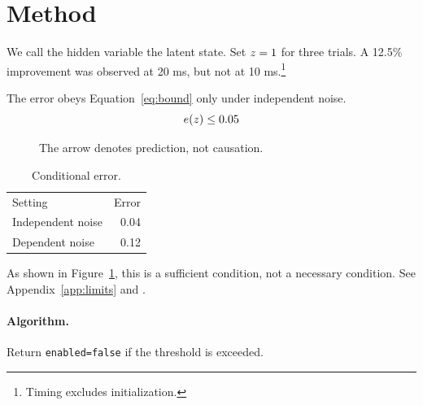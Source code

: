 \section{Method}\label{sec:method}
We call the hidden variable the latent state. Set $z=1$ for three trials. A 12.5\% improvement was observed at 20 ms, but not at 10 ms.\footnote{Timing excludes initialization.}

The error obeys Equation~\ref{eq:bound} only under independent noise.
\begin{equation}\label{eq:bound}
e(z) \leq 0.05
\end{equation}
\begin{figure}[ht]
\centering{}
\caption{The arrow denotes prediction, not causation.}\label{fig:state}
\end{figure}
\begin{table}[ht]\centering
\begin{tabular}{lr}
Setting & Error \\
Independent noise & 0.04 \\
Dependent noise & 0.12
\end{tabular}
\caption{Conditional error.}\label{tab:error}
\end{table}

As shown in Figure~\ref{fig:state}, this is a sufficient condition, not a necessary condition. See Appendix~\ref{app:limits} and \cite{example2024}.

\paragraph{Algorithm.} Return \texttt{enabled=false} if the threshold is exceeded.
